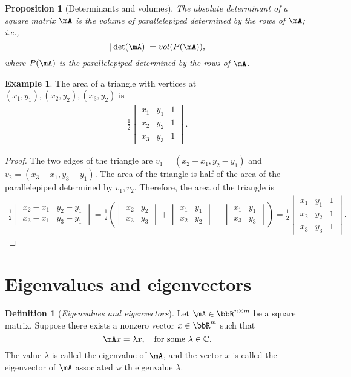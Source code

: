 \documentclass[11pt]{article}
\theoremstyle{plain}
\newtheorem{prop}{Proposition}
\theoremstyle{definition}
\newtheorem{defn}{Definition}
\newtheorem{example}{Example}
\begin{document}
\begin{prop}[Determinants and volumes]
The absolute determinant of a square matrix $\mA$ is the volume of parallelepiped determined by the rows of $\mA$; i.e.,
	\[ |\det(\mA)| = vol(P(\mA)), \]
	where $P(\mA)$ is the parallelepiped determined by the rows of $\mA$.
\end{prop}

\begin{example}
	The area of a triangle with vertices at $(x_1,y_1), (x_2,y_2), (x_3,y_2)$ is
	\begin{align}
		\frac{1}{2} \begin{vmatrix}
			x_1 & y_1 & 1\\
			x_2 & y_2 & 1\\
			x_3 & y_3 & 1
		\end{vmatrix}.
	\end{align}
	
	\begin{proof}
		The two edges of the triangle are $v_1 = (x_2 - x_1, y_2 -y_1)$ and $v_2 = (x_3 - x_1, y_3 -y_1)$. The area of the triangle is half of the area of the parallelepiped determined by $v_1, v_2$. Therefore, the area of the triangle is 
		\begin{align}
			\frac{1}{2} \begin{vmatrix}
				x_2 - x_1 &  y_2 - y_1\\
				x_3 - x_1& y_3 -y_1
			\end{vmatrix} =  \frac{1}{2} \left(  \begin{vmatrix}
				x_2  &  y_2 \\
				x_3 & y_3
			\end{vmatrix} + \begin{vmatrix}
				x_1 &  y_1\\
				x_2& y_2
			\end{vmatrix}  - \begin{vmatrix}
				x_1 &  y_1\\
				x_3 & y_3 
			\end{vmatrix}    \right) = \frac{1}{2} \begin{vmatrix}
			x_1 & y_1 & 1\\
			x_2 & y_2 & 1\\
			x_3 & y_3 & 1
		\end{vmatrix}.
		\end{align}
	\end{proof}
\end{example}

\section{Eigenvalues and eigenvectors}
\begin{defn}[\textit{Eigenvalues and eigenvectors}]\label{def:eigen}
	Let $\mA \in \bbR^{n \times m}$ be a square matrix. Suppose there exists a nonzero vector $x \in \bbR^{m}$ such that
	\[ \mA x = \lambda x, \quad \text{for some } \lambda \in \mathbb{C}. \]
	The value $\lambda$ is called the eigenvalue of $\mA$, and the vector $x$ is called the eigenvector of $\mA$ associated with eigenvalue $\lambda$.
\end{defn}
\end{document}
